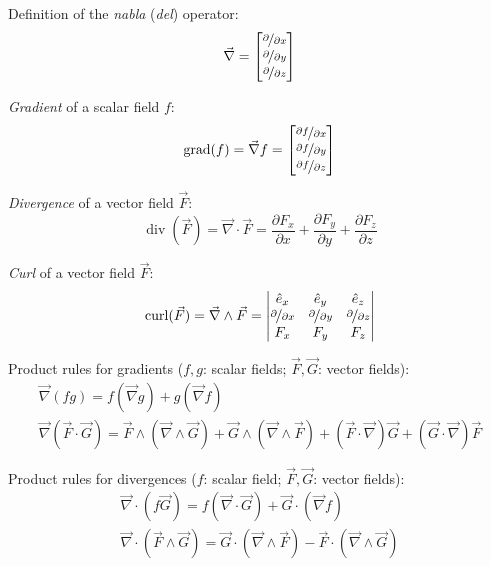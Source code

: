 \documentclass[fontsize=11pt,a4paper]{scrartcl}
\DeclareMathOperator{\grad}{grad}
\DeclareMathOperator{\Div}{div}
\DeclareMathOperator{\curl}{curl}
\begin{document}
Definition of the \emph{nabla} (\emph{del}) operator:
\[
	\vec\nabla = \begin{bmatrix}\nicefrac{\partial}{\partial x}\\
	                            \nicefrac{\partial}{\partial y}\\
	                            \nicefrac{\partial}{\partial z}
	             \end{bmatrix}
\]

\emph{Gradient} of a scalar field $f$:
\[
	\grad(f) = \vec\nabla f = \begin{bmatrix}\nicefrac{\partial f}{\partial x}\\
	                                         \nicefrac{\partial f}{\partial y}\\
	                                         \nicefrac{\partial f}{\partial z}
	                          \end{bmatrix}
\]

\emph{Divergence} of a vector field $\vec F$:
\[
	\Div(\vec F) = \vec\nabla\cdot\vec F = \frac{\partial F_x}{\partial x}
	                                       + \frac{\partial F_y}{\partial y}
	                                       + \frac{\partial F_z}{\partial z}
\]

\emph{Curl} of a vector field $\vec F$:
\[
	\curl(\vec F) = \vec\nabla\wedge\vec F = \begin{vmatrix}\hat e_x & \hat e_y & \hat e_z\\
	                                                        \nicefrac{\partial}{\partial x} & \nicefrac{\partial}{\partial y} & \nicefrac{\partial}{\partial z}\\
	                                                        F_x & F_y & F_z
	                                         \end{vmatrix}
\]

Product rules for gradients ($f,g$: scalar fields; $\vec F,\vec G$: vector fields):
\begin{gather*}
	\vec\nabla(fg) = f(\vec\nabla g) + g(\vec\nabla f)\\
	\vec\nabla(\vec F\cdot\vec G) = \vec F\wedge(\vec\nabla\wedge\vec G) + \vec G\wedge(\vec\nabla\wedge\vec F)
	                               +(\vec F\cdot\vec\nabla)\vec G + (\vec G\cdot\vec\nabla)\vec F
\end{gather*}

Product rules for divergences ($f$: scalar field; $\vec F,\vec G$: vector fields):
\begin{gather*}
	\vec\nabla\cdot(f\vec G) = f(\vec\nabla\cdot\vec G) + \vec G\cdot(\vec\nabla f)\\
	\vec\nabla\cdot(\vec F\wedge\vec G) = \vec G\cdot(\vec\nabla\wedge\vec F) - \vec F\cdot(\vec\nabla\wedge\vec G)
\end{gather*}
\end{document}
